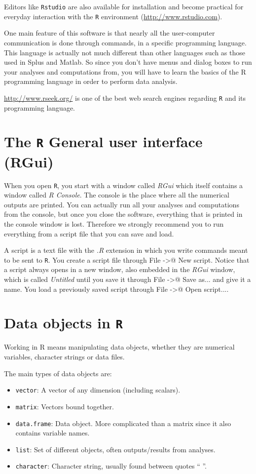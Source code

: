 \documentclass[a4paper,12pt]{article}\usepackage[]{graphicx}\usepackage[]{color}
\begin{document}
Editors like \texttt{Rstudio} are also available for installation and become practical for everyday interaction with the \texttt{R} environment (\url{http://www.rstudio.com}). 

One main feature of this software is that nearly all the user-computer communication is done through commands, in a specific programming language. This language is actually not much different than other languages such as those used in Splus and Matlab. So since you don't have menus and dialog boxes to run your analyses and computations from, you will have to learn the basics of the R programming language in order to perform data analysis.

\url{http://www.rseek.org/} is one of the best web search engines regarding \texttt{R} and its programming language.

\section{The \texttt{R} General user interface (RGui)}

When you open \texttt{R}, you start with a window called \emph{RGui} which itself contains a window called \emph{R Console}. The console is the place where all the numerical outputs are printed. You can actually run all your analyses and computations from the console, but once you close the software, everything that is printed in the console window is lost. Therefore we strongly recommend you to run everything from a script file that you can save and load.

A script is a text file with the \emph{.R} extension in which you write commands meant to be sent to \texttt{R}. You create a script file through \textsf{File} \verb@->@ \textsf{New script}. Notice that a script always opens in a new window, also embedded in the \emph{RGui} window, which is called \emph{Untitled} until you save it through \textsf{File} \verb@->@ \textsf{Save as...} and give it a name. You load a previously saved script through \textsf{File} \verb@->@ \textsf{Open script...}.


\section{Data objects in \texttt{R}}
\label{objects}

Working in R means manipulating data objects, whether they are numerical variables, character strings or data files.

The main types of data objects are:
\begin{itemize}
\item{\texttt{vector}: A vector of any dimension (including scalars).}
\item{\texttt{matrix}: Vectors bound together.}
\item{\texttt{data.frame}: Data object. More complicated than a matrix since it also contains variable names.}
\item{\texttt{list}: Set of different objects, often outputs/results from analyses.}
\item{\texttt{character}: Character string, usually found between quotes `` ''.}
\end{itemize}
\end{document}
